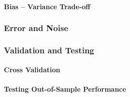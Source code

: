 \paragraph{Bias -- Variance Trade-off}
\label{par:Bias-VarianceTrade-off}

\subsubsection{Error and Noise}
\label{ssub:ErrorandNoise}
\subsubsection{Validation and Testing}
\label{ssub:ValidationandTesting}
\paragraph{Cross Validation}
\label{par:CrossValidation}
\paragraph{Testing Out-of-Sample Performance}
\label{par:Testing Out-of-Sample Performance}


